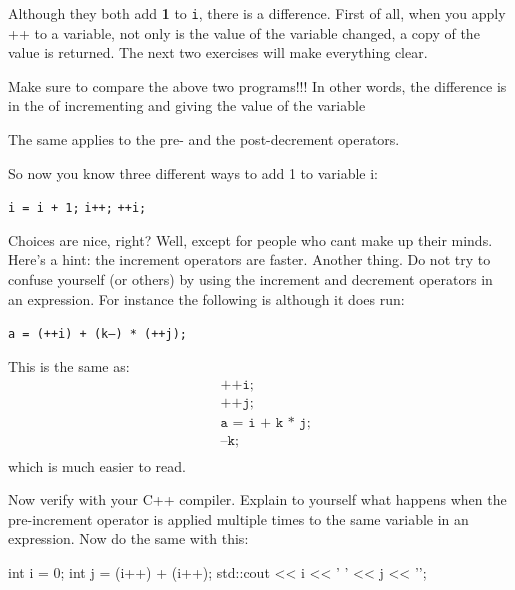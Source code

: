 Although they both add \textbf{1} to \texttt{i}, there is a difference. First of all, when you apply ++ to a variable, not only is the value of the variable changed, a copy of the value is returned. The next two exercises will make
everything clear.

Make sure to compare the above two programs!!!
In other words, the difference is in the  of incrementing and giving the value of the variable

The same applies to the pre- and the post-decrement operators.

So now you know three different ways to add 1 to variable i:
\begin{center}
 \texttt{i = i + 1;}        \texttt{i++;}        \texttt{++i;}
\end{center}

Choices are nice, right? Well, except for people who cant make up their minds. Here's a hint: the increment operators are faster.
Another thing. Do not try to confuse yourself (or others) by using the increment and decrement operators in an expression. For instance the following is  although it does run:
\begin{center}
\texttt{a = (++i) + (k--) * (++j);}
\end{center}
This is the same as:
\begin{align*}
&\texttt{++i;}\\
&\texttt{++j;}\\
&\texttt{a = i + k * j;}\\
&\texttt{--k;}\\
\end{align*}
which is much easier to read.


Now verify with your C++ compiler. Explain to yourself what happens when
the pre-increment operator is applied multiple times to the same
variable in an expression. Now do the same with this:
\begin{console}
int i = 0;
int j = (i++) + (i++);
std::cout << i << ' ' << j << '\n';
\end{console}

